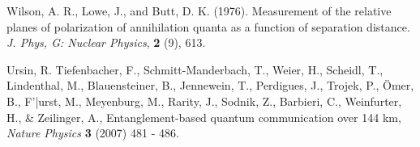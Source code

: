 \documentclass[12pt]{article}
\begin{document}
\begin{thebibliography}{99}
 Wilson, A. R., Lowe, J., and Butt, D. K. (1976). Measurement of the relative planes of polarization of annihilation quanta as a function of separation distance. {\em J. Phys, G: Nuclear Physics}, {\bf 2} (9), 613.

 Ursin, R. Tiefenbacher, F., Schmitt-Manderbach, T., Weier, H., Scheidl, T., Lindenthal, M., Blauensteiner, B., Jennewein, T., Perdigues, J., Trojek, P., \"{O}mer, B., F'|{u}rst, M., Meyenburg, M., Rarity, J., Sodnik, Z.,  Barbieri, C., Weinfurter, H., \&  Zeilinger, A., Entanglement-based quantum communication over 144 km, {\em Nature Physics} {\bf 3} (2007)  481 - 486.

\end{thebibliography}
\end{document}
